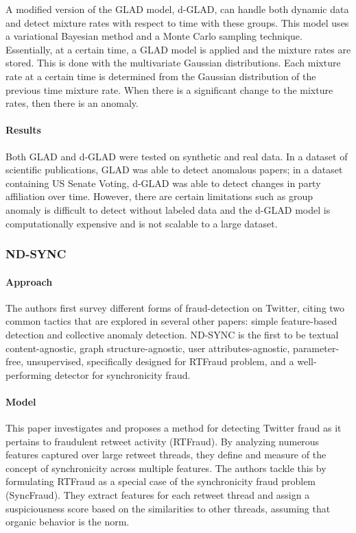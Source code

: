 \documentclass[11pt, oneside]{article}   	%
\begin{document}
\quad A modified version of the GLAD model, d-GLAD, can handle both dynamic data and detect mixture rates with respect to time with these groups.
This model uses a variational Bayesian method and a Monte Carlo sampling technique.
Essentially, at a certain time, a GLAD model is applied and the mixture rates are stored.
This is done with the multivariate Gaussian distributions.
Each mixture rate at a certain time is determined from the Gaussian distribution of the previous time mixture rate.
When there is a significant change to the mixture rates, then there is an anomaly.

\paragraph{Results}
\quad

\quad Both GLAD and d-GLAD were tested on synthetic and real data.
In a dataset of scientific publications, GLAD was able to detect anomalous papers; in a dataset containing US Senate Voting, d-GLAD was able to detect changes in party affiliation over time.
However, there are certain limitations such as group anomaly is difficult to detect without labeled data and the d-GLAD model is computationally expensive and is not scalable to a large dataset.

\subsubsection{ND-SYNC}

\paragraph{Approach}
\quad

\quad The authors first survey different forms of fraud-detection on Twitter,
citing two common tactics that are explored in several other papers: simple
feature-based detection and collective anomaly detection.  ND-SYNC \cite{ndsync} is the first
to be textual content-agnostic, graph structure-agnostic, user
attributes-agnostic, parameter-free, unsupervised, specifically designed for
RTFraud problem, and a well-performing detector for synchronicity fraud.  

\paragraph{Model}
\quad

\quad This paper investigates and proposes a method for detecting Twitter fraud
as it pertains to fraudulent retweet activity (RTFraud).  By analyzing numerous
features captured over large retweet threads, they define and measure of the
concept of synchronicity across multiple features.  The authors tackle this by
formulating RTFraud as a special case of the synchronicity fraud problem
(SyncFraud).  They extract features for each retweet thread and assign a
suspiciousness score based on the similarities to other threads, assuming that
organic behavior is the norm.
\end{document}
